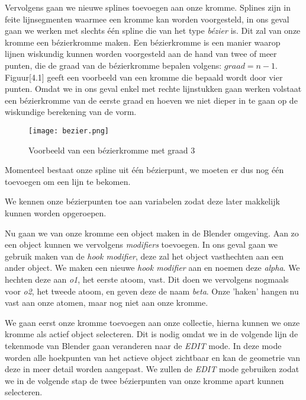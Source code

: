 
Vervolgens gaan we nieuwe splines toevoegen aan onze kromme. Splines zijn in feite lijnsegmenten waarmee een kromme kan worden voorgesteld, in ons geval gaan we werken met slechts één spline die van het type \textit{bézier} is. Dit zal van onze kromme een bézierkromme maken. Een bézierkromme is een manier waarop lijnen wiskundig kunnen worden voorgesteld aan de hand van twee of meer punten, die de graad van de 	bézierkromme bepalen volgens: $graad = n - 1$. Figuur[4.1] geeft een voorbeeld van een kromme die bepaald wordt door vier punten. Omdat we in ons geval enkel met rechte lijnstukken gaan werken volstaat een bézierkromme van de eerste graad en hoeven we niet dieper in te gaan op de wiskundige berekening van de vorm.

\begin{figure}[H]
\begin{center}
\texttt{[image: bezier.png]}
\caption{Voorbeeld van een bézierkromme met graad 3 \citep*{BEZ1}}
\end{center}
\end{figure}

Momenteel bestaat onze spline uit één bézierpunt, we moeten er dus nog één toevoegen om een lijn te bekomen.



We kennen onze bézierpunten toe aan variabelen zodat deze later makkelijk kunnen worden opgeroepen.



Nu gaan we van onze kromme een object maken in de Blender omgeving. Aan zo een object kunnen we vervolgens \textit{modifiers} toevoegen. In ons geval gaan we gebruik maken van de \textit{hook modifier}, deze zal het object vasthechten aan een ander object. We maken een nieuwe \textit{hook modifier} aan en noemen deze \textit{alpha}. We hechten deze aan \textit{o1}, het eerste atoom, vast. Dit doen we vervolgens nogmaals voor \textit{o2}, het tweede atoom, en geven deze de naam \textit{beta}. Onze 'haken' hangen nu vast aan onze atomen, maar nog niet aan onze kromme.

  

We gaan eerst onze kromme toevoegen aan onze collectie, hierna kunnen we onze kromme als actief object selecteren. Dit is nodig omdat we in de volgende lijn de tekenmode van Blender gaan veranderen naar de \textit{EDIT} mode. In deze mode worden alle hoekpunten van het actieve object zichtbaar en kan de geometrie van deze in meer detail worden aangepast. We zullen de \textit{EDIT} mode gebruiken zodat we in de volgende stap de twee bézierpunten van onze kromme apart kunnen selecteren. 

